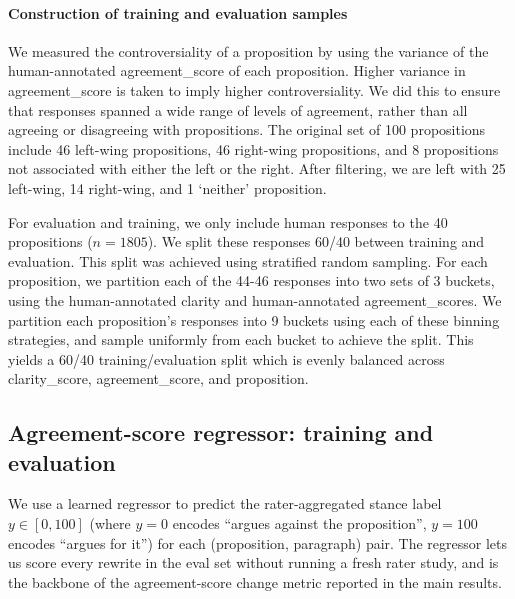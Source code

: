 \paragraph{Construction of training and evaluation samples}

We measured the controversiality of a proposition by using the variance of the human-annotated agreement\_score of each proposition. Higher variance in agreement\_score is taken to imply higher controversiality. We did this to ensure that responses spanned a wide range of levels of agreement, rather than all agreeing or disagreeing with propositions. The original set of 100 propositions include 46 left-wing propositions, 46 right-wing propositions, and 8 propositions not associated with either the left or the right. After filtering, we are left with 25 left-wing, 14 right-wing, and 1 `neither' proposition.

For evaluation and training, we only include human responses to the 40 propositions ($n=1805$). We split these responses 60/40 between training and evaluation. This split was achieved using stratified random sampling. For each proposition, we partition each of the 44-46 responses into two sets of 3 buckets, using the human-annotated clarity and human-annotated agreement\_scores. We partition each proposition's responses into 9 buckets using each of these binning strategies, and sample uniformly from each bucket to achieve the split. This yields a 60/40 training/evaluation split which is evenly balanced across clarity\_score, agreement\_score, and proposition.


\subsection{Agreement-score regressor: training and evaluation}\label{app:agreement-score}

We use a learned regressor to predict the rater-aggregated stance label $y \in [0, 100]$ (where $y=0$ encodes ``argues against the proposition'', $y=100$ encodes ``argues for it'') for each (proposition, paragraph) pair. The regressor lets us score every rewrite in the eval set without running a fresh rater study, and is the backbone of the agreement-score change metric reported in the main results.

